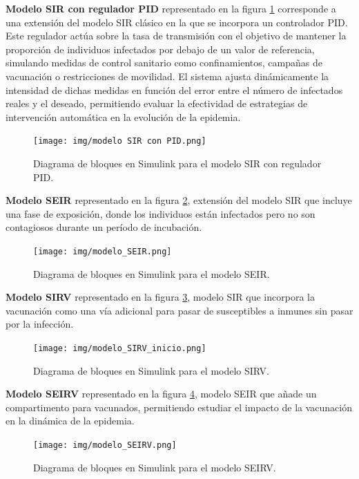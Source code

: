 \textbf{Modelo SIR con regulador PID} representado en la figura \ref{fig: diagrama de bloques en Simulink para el modelo SIR con regulador PID} corresponde a una extensión del modelo SIR clásico en la que se incorpora un controlador PID. Este regulador actúa sobre la tasa de transmisión con el objetivo de mantener la proporción de individuos infectados por debajo de un valor de referencia, simulando medidas de control sanitario como confinamientos, campañas de vacunación o restricciones de movilidad. El sistema ajusta dinámicamente la intensidad de dichas medidas en función del error entre el número de infectados reales y el deseado, permitiendo evaluar la efectividad de estrategias de intervención automática en la evolución de la epidemia.
\begin{figure}[H]
        \centering
        \texttt{[image: img/modelo SIR con PID.png]}
        \caption{Diagrama de bloques en Simulink para el modelo SIR con regulador PID.}
        \label{fig: diagrama de bloques en Simulink para el modelo SIR con regulador PID}
        
\end{figure}



\textbf{Modelo SEIR} representado en la figura \ref{fig: diagrama de bloques en Simulink para el modelo SEIR}, extensión del modelo SIR que incluye una fase de exposición, donde los individuos están infectados pero no son contagiosos durante un período de incubación.
\begin{figure}[H]
        \centering
        \texttt{[image: img/modelo\_SEIR.png]}
        \caption{Diagrama de bloques en Simulink para el modelo SEIR.}
        \label{fig: diagrama de bloques en Simulink para el modelo SEIR}
        
\end{figure}

\textbf{Modelo SIRV} representado en la figura \ref{fig: diagrama de bloques en Simulink para el modelo SIRV}, modelo SIR que incorpora la vacunación como una vía adicional para pasar de susceptibles a inmunes sin pasar por la infección.
\begin{figure}[H]
        \centering
        \texttt{[image: img/modelo\_SIRV\_inicio.png]}
        \caption{Diagrama de bloques en Simulink para el modelo SIRV.}
        \label{fig: diagrama de bloques en Simulink para el modelo SIRV}
        
\end{figure}


\textbf{Modelo SEIRV} representado en la figura \ref{fig: diagrama de bloques en Simulink para el modelo SEIRV}, modelo SEIR que añade un compartimento para vacunados, permitiendo estudiar el impacto de la vacunación en la dinámica de la epidemia.
\begin{figure}[H]
        \centering
        \texttt{[image: img/modelo\_SEIRV.png]}
        \caption{Diagrama de bloques en Simulink para el modelo SEIRV.}
        \label{fig: diagrama de bloques en Simulink para el modelo SEIRV}
       
\end{figure}


